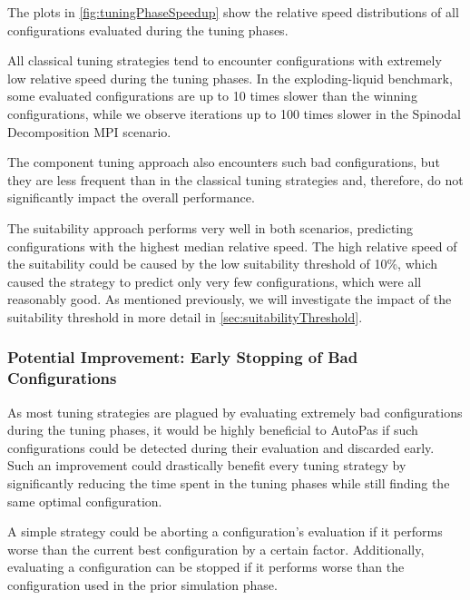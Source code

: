The plots in \autoref{fig:tuningPhaseSpeedup} show the relative speed distributions of all configurations evaluated during the tuning phases.

All classical tuning strategies tend to encounter configurations with extremely low relative speed during the tuning phases. In the exploding-liquid benchmark, some evaluated configurations are up to 10 times slower than the winning configurations, while we observe iterations up to 100 times slower in the Spinodal Decomposition MPI scenario.

The component tuning approach also encounters such bad configurations, but they are less frequent than in the classical tuning strategies and, therefore, do not significantly impact the overall performance.

The suitability approach performs very well in both scenarios, predicting configurations with the highest median relative speed. The high relative speed of the suitability could be caused by the low suitability threshold of 10\%, which caused the strategy to predict only very few configurations, which were all reasonably good. As mentioned previously, we will investigate the impact of the suitability threshold in more detail in \autoref{sec:suitabilityThreshold}.

\subsubsection{Potential Improvement: Early Stopping of Bad Configurations}
\label{sec:earlyStopping}

As most tuning strategies are plagued by evaluating extremely bad configurations during the tuning phases, it would be highly beneficial to AutoPas if such configurations could be detected during their evaluation and discarded early. Such an improvement could drastically benefit every tuning strategy by significantly reducing the time spent in the tuning phases while still finding the same optimal configuration.

A simple strategy could be aborting a configuration's evaluation if it performs worse than the current best configuration by a certain factor. Additionally, evaluating a configuration can be stopped if it performs worse than the configuration used in the prior simulation phase.

